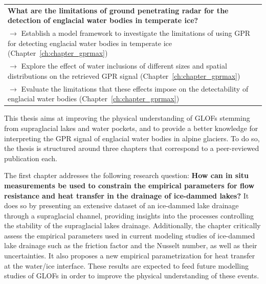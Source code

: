 \begin{center}
\begin{longtable}{|p{}|}
\\
\textbf{What are the limitations of ground penetrating radar for the detection of englacial water bodies in temperate ice?} \\
$\rightarrow$ Establish a model framework to investigate the limitations of using GPR for detecting englacial water bodies in temperate ice (Chapter~\ref{ch:chapter_gprmax}) \\
$\rightarrow$ Explore the effect of water inclusions of different sizes and spatial distributions on the retrieved GPR signal (Chapter~\ref{ch:chapter_gprmax}) \\
$\rightarrow$ Evaluate the limitations that these effects impose on the detectability of englacial water bodies (Chapter~\ref{ch:chapter_gprmax}) \\

\hline
\end{longtable}
\end{center}



This thesis aims at improving the physical understanding of GLOFs stemming from supraglacial lakes and water pockets, and to provide a better knowledge for interpreting the GPR signal of englacial water bodies in alpine glaciers. To do so, the thesis is structured around three chapters that correspond to a peer-reviewed publication each.
%

The first chapter \citep{Ogier&al2021} addresses the following research question: \textbf{How can in situ measurements be used to constrain the empirical parameters for flow resistance and heat transfer in the drainage of ice-dammed lakes?} It does so by presenting an extensive dataset of an ice-dammed lake drainage through a supraglacial channel, providing insights into the processes controlling the stability of the supraglacial lakes drainage. Additionally, the chapter critically assess the empirical parameters used in current modeling studies of ice-dammed lake drainage such as the friction factor and the Nusselt number, as well as their uncertainties. It also proposes a new empirical parametrization for heat transfer at the water/ice interface. These results are expected to feed future modelling studies of GLOFs in order to improve the physical understanding of these events.
%

